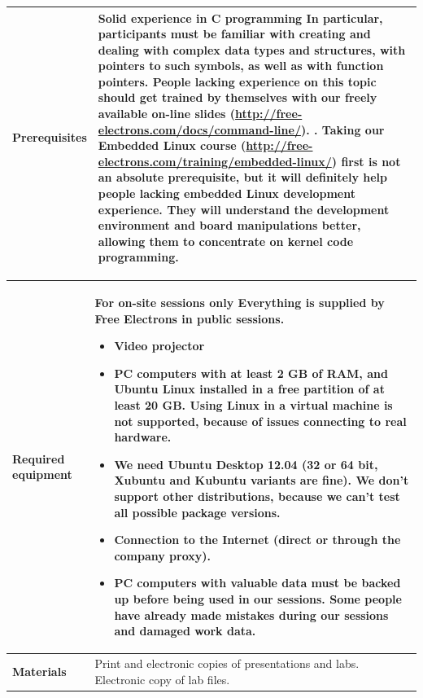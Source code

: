 \documentclass[a4paper,12pt,obeyspaces,spaces,hyphens]{article}
\begin{document}
{\begin{tabularx}{\textwidth}{|g|h|}
    {\bf Prerequisites} &

    {\bf Solid experience in C programming}
    \newline In particular, participants must be familiar
    with creating and dealing with complex data types and structures,
    with pointers to such symbols, as well as with function pointers. \vspace{1em}
    \newline People lacking experience on this topic should get
    trained by themselves with our freely available on-line slides
    (\url{http://free-electrons.com/docs/command-line/}).\vspace{1em}
    .
    \newline Taking our Embedded Linux course
    (\url{http://free-electrons.com/training/embedded-linux/})
    first is not an absolute prerequisite, but it will definitely
    help people lacking embedded Linux development experience.
    They will understand the development environment
    and board manipulations better, allowing them to concentrate on
    kernel code programming.
    \\
    \hline
  \end{tabularx}

  \begin{tabularx}{\textwidth}{|g|h|}
    {\bf Required equipment} &
    {\bf For on-site sessions only}
    \newline Everything is supplied by Free Electrons in public sessions.
    \begin{itemize}
    \item Video projector
    \item PC computers with at least 2 GB of RAM, and Ubuntu Linux
    installed in a {\bf free partition of at least 20 GB. Using Linux
      in a virtual machine is not supported}, because of issues
    connecting to real hardware.
    \item We need Ubuntu Desktop 12.04 (32 or 64 bit, Xubuntu and
    Kubuntu variants are fine). We don't support other
    distributions, because we can't test all possible package versions.
    \item {\bf Connection to the Internet} (direct or through the
    company proxy).
    \item {\bf PC computers with valuable data must be backed up}
    before being used in our sessions.  Some people have already made
    mistakes during our sessions and damaged work data.
    \end{itemize} \\
    \hline

    {\bf Materials} & Print and electronic copies of presentations and
    labs.
    \newline Electronic copy of lab files.\\
    \hline

\end{tabularx}}
\normalsize
\end{document}
